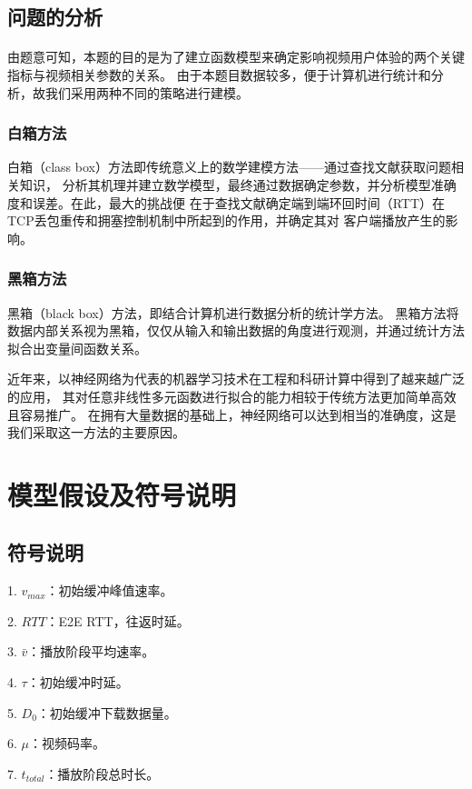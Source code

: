 \documentclass[UTF8]{ctexart}
\begin{document}
\subsection{问题的分析}
\paragraph{}
由题意可知，本题的目的是为了建立函数模型来确定影响视频用户体验的两个关键指标与视频相关参数的关系。
由于本题目数据较多，便于计算机进行统计和分析，故我们采用两种不同的策略进行建模。
\subsubsection{白箱方法}
白箱（class box）方法即传统意义上的数学建模方法——通过查找文献获取问题相关知识，
分析其机理并建立数学模型，最终通过数据确定参数，并分析模型准确度和误差。在此，最大的挑战便
在于查找文献确定端到端环回时间（RTT）在TCP丢包重传和拥塞控制机制中所起到的作用，并确定其对
客户端播放产生的影响。

\subsubsection{黑箱方法}
黑箱（black box）方法，即结合计算机进行数据分析的统计学方法。
黑箱方法将数据内部关系视为黑箱，仅仅从输入和输出数据的角度进行观测，并通过统计方法拟合出变量间函数关系。

近年来，以神经网络为代表的机器学习技术在工程和科研计算中得到了越来越广泛的应用，
其对任意非线性多元函数进行拟合的能力相较于传统方法更加简单高效且容易推广。
在拥有大量数据的基础上，神经网络可以达到相当的准确度，这是我们采取这一方法的主要原因。

\section{模型假设及符号说明}

\subsection{符号说明}
1. $v_{max} $：初始缓冲峰值速率。

2. $RTT$：E2E RTT，往返时延。

3. $ \bar{v} $：播放阶段平均速率。 

4. $ \tau $：初始缓冲时延。

5. $D_{0} $：初始缓冲下载数据量。

6. $\mu $：视频码率。

7. $t_{total} $：播放阶段总时长。
\end{document}
